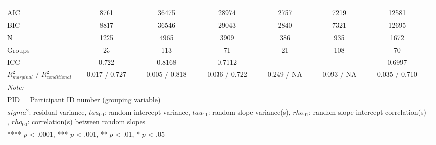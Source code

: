 \begin{landscape}
\begin{table}
\begin{minipage}[t][\textheight][t]{\textwidth}
{\begin{tabular}[t]{lcccccccccccc}
\addlinespace[0.3em]
\multicolumn{13}{l}{\textbf{Fit}}\\
\hspace{1em}AIC & 8761 &  & 36475 &  & 28974 &  & 2757 &  & 7219 &  & 12581 & \\
\hspace{1em}BIC & 8817 &  & 36546 &  & 29043 &  & 2840 &  & 7321 &  & 12695 & \\
\hspace{1em}N & 1225 &  & 4965 &  & 3909 &  & 386 &  & 935 &  & 1672 & \\
\hspace{1em}Groups & 23 &  & 113 &  & 71 &  & 21 &  & 108 &  & 70 & \\
\hspace{1em}ICC & 0.722 &  & 0.8168 &  & 0.7112 &  &  &  &  &  & 0.6997 & \\
\hspace{1em}$R^2_{marginal}$ / $R^2_{conditional}$ & 0.017 / 0.727 &  & 0.005 / 0.818 &  & 0.036 / 0.722 &  & 0.249 / NA &  & 0.093 / NA &  & 0.035 / 0.710 & \\
\bottomrule
\multicolumn{13}{l}{\rule{0pt}{1em}\textit{Note: }}\\
\multicolumn{13}{l}{\rule{0pt}{1em}PID = Participant ID number (grouping variable)}\\
\multicolumn{13}{l}{\rule{0pt}{1em}$sigma^2$: residual variance, $tau_{00}$: random intercept variance, $tau_{11}$: random slope variance(s), $rho_{01}$: random slope-intercept correlation(s) , $rho_{00}$: correlation(s) between random slopes}\\
\multicolumn{13}{l}{\rule{0pt}{1em}**** $p$ < .0001, *** $p$ < .001, ** $p$ < .01, * $p$ < .05}\\
\end{tabular}}
\end{minipage}
\end{table}
\end{landscape}
